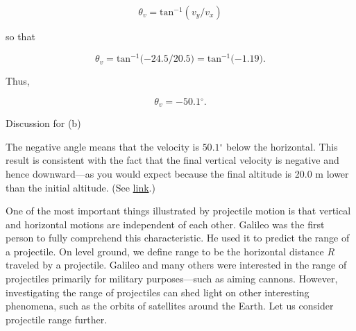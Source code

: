 \documentclass[
]{book}
\begin{document}
\leavevmode{}%
\[{{\theta_{v} = \text{tan}^{- 1}}({v_{y}/v_{x}})}{}\]

so that

\leavevmode{}%
\[{{\theta_{v} = \text{tan}^{- 1}}{( - \text{24}}\text{.}{5/\text{20}}\text{.}5{) = \text{tan}^{- 1}}{( - 1}\text{.}\text{19})\text{.}}{}\]

Thus,

\leavevmode{}%
\[{{\theta_{v} = {- \text{50}}}\text{.}1{{^\circ}\text{.}}}{}\]

{Discussion for (b)}

The negative angle means that the velocity is
\({\text{50}\text{.}1{^\circ}}{}\) below the horizontal. This result is
consistent with the fact that the final vertical velocity is negative
and hence downward---as you would expect because the final altitude is
20.0 m lower than the initial altitude. (See
\protect\hyperlink{import-auto-id1817519}{link}.)

One of the most important things illustrated by projectile motion is
that vertical and horizontal motions are independent of each other.
Galileo was the first person to fully comprehend this characteristic. He
used it to predict the range of a projectile. On level ground, we define
\protect\hypertarget{import-auto-id1751163}{}{range} to be the horizontal
distance \(R{}\) traveled by a projectile. Galileo and many others were
interested in the range of projectiles primarily for military
purposes---such as aiming cannons. However, investigating the range of
projectiles can shed light on other interesting phenomena, such as the
orbits of satellites around the Earth. Let us consider projectile range
further.
\end{document}
